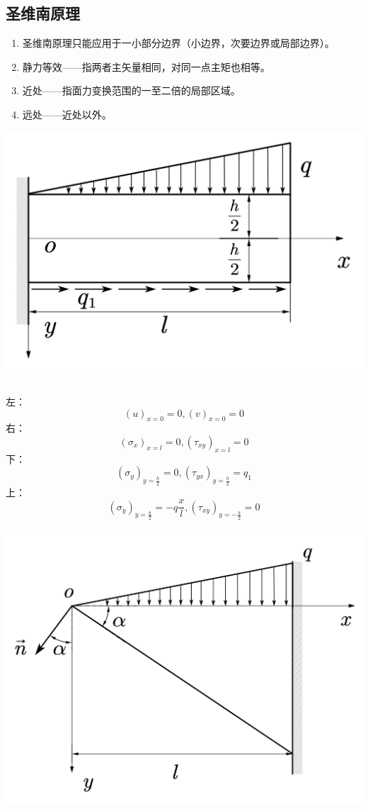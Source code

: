 \subsection{圣维南原理}
\begin{enumerate}
	\item 圣维南原理只能应用于一小部分边界（小边界，次要边界或局部边界）。
	\item 静力等效——指两者主矢量相同，对同一点主矩也相等。
	\item 近处——指面力变换范围的一至二倍的局部区域。
	\item 远处——近处以外。
\end{enumerate}
\begin{example}
\end{example}
	\centerline{\includegraphics[scale=0.45]{figure/2-1.png}}
\begin{remark}
	\quad\\
	左：\[\left( u \right) _{x=0}=0,\left( v \right) _{x=0}=0\]
	右：\[\left( \sigma _x \right) _{x=l}=0,\left( \tau _{xy} \right) _{x=l}=0\]
	下：\[\left( \sigma _y \right) _{y=\frac{h}{2}}=0,\left( \tau _{yx} \right) _{y=\frac{h}{2}}=q_1\]
	上：\[\left( \sigma _y \right) _{y=\frac{h}{2}}=-q\frac{x}{l},\left( \tau _{xy} \right) _{y=-\frac{h}{2}}=0\]
\end{remark}
\begin{example}
\end{example}
	\centerline{\includegraphics[scale=0.4]{figure/2-2.png}}
